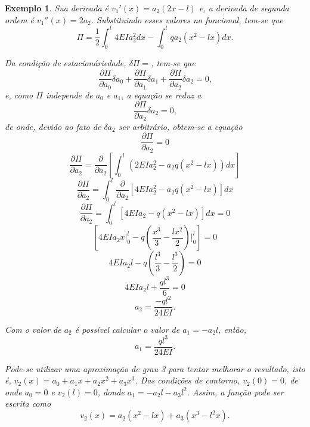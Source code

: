 \documentclass[12pt,a4paper]{article}
\newtheorem{example}{Exemplo}
\begin{document}
\begin{example}
	Sua derivada é $v_1'(x)=a_2(2x-l)$ e, a derivada de segunda ordem é $v_1''(x)=2a_2$. Substituindo esses valores no funcional, tem-se que
	$$
		\Pi =
		\frac{1}{2}
		\int_0^l 4 EI a_2 ^2 dx
		-
		\int_0^l q a_2 (x^2-lx) dx
		\text{.}
	$$
	
	Da condição de estacionáriedade, $\delta \Pi=$, tem-se que
	$$
		\frac{\partial \Pi}{\partial a_0} \delta a_0
		+
		\frac{\partial \Pi}{\partial a_1} \delta a_1
		+
		\frac{\partial \Pi}{\partial a_2} \delta a_2
		= 0 \text{,}
	$$
	e, como $\Pi$ independe de $a_0$ e $a_1$, a equação se reduz a
	$$
		\frac{\partial \Pi}{\partial a_2} \delta a_2 
		= 0
		\text{,}
	$$
	de onde, devido ao fato de $\delta a_2$ ser arbitrário, obtem-se a equação
	$$
		\frac{\partial \Pi}{\partial a_2} = 0
	$$
	$$
		\frac{\partial \Pi}{\partial a_2}
		=
		\frac{\partial}{\partial a_2} \left [
			\int_0^l \left ( 2EIa_2 ^2 - a_2 q (x^2 -lx) \right ) dx
		\right]
	$$
	$$
		\frac{\partial \Pi}{\partial a_2}
		=
		\int_0^l
			\frac{\partial}{\partial a_2} \left [
			4EIa_2^2 - a_2 q(x^2-lx)
		\right ] dx
	$$
	$$
		\frac{\partial \Pi}{\partial a_2}
		=
		\int_0^l \left [
			4EIa_2 - q(x^2-lx)
		\right ] dx = 0
	$$
	$$
		\left [ 
			4EIa_2 x \Big |_0^l
			-
			q \left (
				\frac{x^3}{3} - \frac{lx^2}{2}
			\right ) \Big |_0^l
		\right ] 
		= 0
	$$
	$$
		4EIa_2l
		-
		q \left (\frac{l^3}{3} - \frac{l^3}{2} \right )
		= 0
	$$	
	$$
		4EIa_2l+\frac{ql^3}{6} = 0
	$$
	$$
		a_2=\frac{-ql^2}{24EI}\text{.}
	$$

	Com o valor de $a_2$ é possível calcular o valor de $a_1=-a_2l$, então, $$a_1=\frac{ql^3}{24EI}\text{.}$$
	
	Pode-se utilizar uma aproximação de grau 3 para tentar melhorar o resultado, isto é, $v_2(x)=a_0+a_1x+a_2x^2+a_3x^3$. Das condições de contorno, $v_2(0)=0$, de onde $a_0=0$ e $v_2(l)=0$, donde $a_1=-a_2 l - a_3 l^2$. Assim, a função pode ser escrita como
	$$
		v_2(x)=
		a_2(x^2-lx)
		+
		a_3(x^3-l^2x)
		\text{.}
	$$
	
\end{example}
\end{document}
